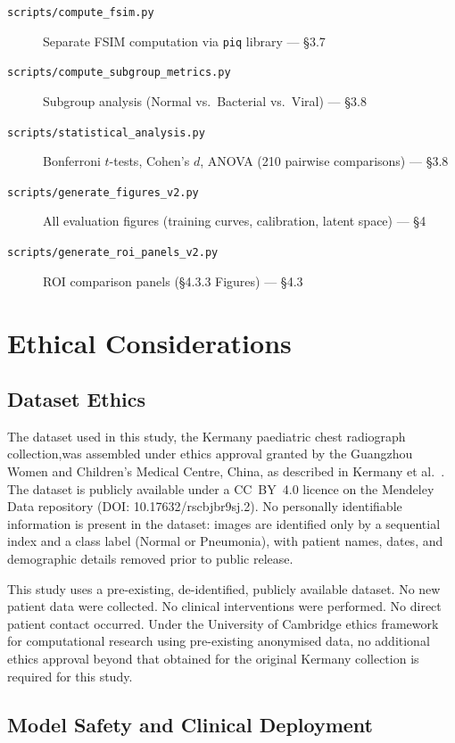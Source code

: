 \documentclass[12pt, a4paper, twoside, openright]{book}
\begin{document}
\begin{appendices}
\begin{description}
  \item[\texttt{scripts/compute\_fsim.py}] Separate FSIM computation via \texttt{piq} library --- §3.7
  \item[\texttt{scripts/compute\_subgroup\_metrics.py}] Subgroup analysis (Normal vs.\ Bacterial vs.\ Viral) --- §3.8
  \item[\texttt{scripts/statistical\_analysis.py}] Bonferroni $t$-tests, Cohen's $d$, ANOVA (210 pairwise comparisons) --- §3.8
  \item[\texttt{scripts/generate\_figures\_v2.py}] All evaluation figures (training curves, calibration, latent space) --- §4
  \item[\texttt{scripts/generate\_roi\_panels\_v2.py}] ROI comparison panels (§4.3.3 Figures) --- §4.3
\end{description}

\chapter{Ethical Considerations}
\label{app:ethics}

\section{Dataset Ethics}
\label{app:ethics:dataset}

The dataset used in this study, the Kermany paediatric chest radiograph collection,was assembled under ethics approval granted by the Guangzhou Women and Children's Medical Centre, China, as described in Kermany et al.\ \cite{kermany_identifying_2018}. The dataset is publicly available under a CC~BY~4.0 licence on the Mendeley Data repository (DOI: 10.17632/rscbjbr9sj.2). No personally identifiable information is present in the dataset: images are identified only by a sequential index and a class label (Normal or Pneumonia), with patient names, dates, and demographic details removed prior to public release.

This study uses a pre-existing, de-identified, publicly available dataset. No new patient data were collected. No clinical interventions were performed. No direct patient contact occurred. Under the University of Cambridge ethics framework for computational research using pre-existing anonymised data, no additional ethics approval beyond that obtained for the original Kermany collection is required for this study.

\section{Model Safety and Clinical Deployment}
\label{app:ethics:deployment}


\end{appendices}
\end{document}
